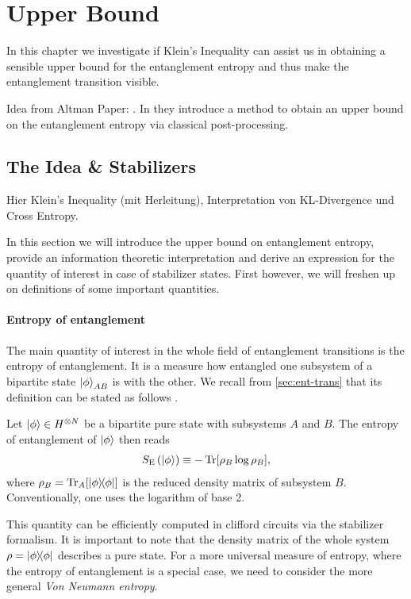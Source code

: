 \chapter{Upper Bound}
\label{ch:rel-ent}

In this chapter we investigate if Klein's Inequality can assist us in obtaining
a sensible upper bound for the entanglement entropy and thus make the
entanglement transition visible.

Idea from Altman Paper:
\cite{garrattProbingPostmeasurementEntanglement2023}.
In \cite{garrattProbingPostmeasurementEntanglement2023} they introduce a method
to obtain an upper bound on the entanglement entropy via classical
post-processing.

\section{The Idea \& Stabilizers}
Hier Klein's Inequality (mit Herleitung), Interpretation von KL-Divergence und
Cross Entropy.

In this section we will introduce the upper bound on entanglement entropy,
provide an information theoretic interpretation and derive an expression for
the quantity of interest in case of stabilizer states. First however, we will
freshen up on definitions of some important quantities.
\subsubsection{Entropy of entanglement}
The main quantity of interest in the whole field of entanglement transitions is
the entropy of entanglement. It is a measure how entangled one subsystem of a
bipartite state $\ket{\phi}_{AB}$ is with the other. We recall from
\cref{sec:ent-trans} that its definition can be stated as follows
\cite{fattalEntanglementStabilizerFormalism2004}.
\begin{defn}\label{defn:entanglement-entropy}
  Let $\ket{\phi}\in H^{\otimes N}$ be a bipartite pure state with subsystems
  $A$ and $B$. The entropy of entanglement of $\ket{\phi}$ then reads
  \begin{align}
    S_\mathrm{E}\left(\ket{\phi}\right) \equiv - \Tr[\rho_B \log \rho_B],
  \end{align}
  where $\rho_B = \Tr_A[\dyad{\phi}]$ is the reduced density matrix of subsystem
  $B$. Conventionally, one uses the logarithm of base 2.
\end{defn}
This quantity can be efficiently computed in clifford circuits via the
stabilizer formalism. It is important to note that the density matrix of the
whole system $\rho = \dyad{\phi}$ describes a pure state. For a more universal
measure of entropy, where the entropy of entanglement is a special case, we
need to consider the more general \emph{Von Neumann entropy}.
